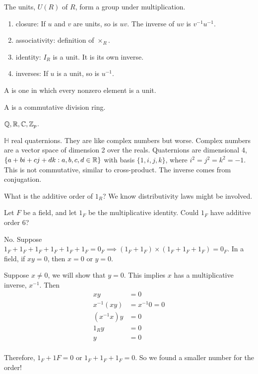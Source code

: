 \documentclass[class=article,crop=false]{standalone}
\begin{document}
\begin{thm}[]
	The units, $ U(R)$ of  $ R$, form a group under multiplication.
\end{thm}
\begin{prf}
\begin{enumerate}[label=(\roman*)]
	\item closure: If $ u$ and  $ v$ are units, so is  $ uv$. The inverse of  $ uv$ is $ v^{-1}u^{-1}$.
	\item associativity: definition of $ \times _R$.
	\item identity: $ I_R$ is a unit. It is its own inverse.
	\item inverses: If  $ u$ is a unit, so is  $ u^{-1}$.
\end{enumerate}
\end{prf}
\begin{defn}
A  is one in which every nonzero element is a unit. 
\end{defn}
\begin{defn}[fields]
	A  is a commutative division ring. 
\end{defn}
\begin{eg}[]
$ \mathbb{Q}, \mathbb{R}, \mathbb{C}, \mathbb{Z}_p$.
\end{eg}
\begin{eg}
	$ \mathbb{H}$ real quaternions. They are like complex numbers but worse. Complex numbers are a vector space of dimension 2 over the reals. Quaternions are dimensional 4, $ \{a+bi+cj+dk: a,b,c,d \in \mathbb{R}\} $ with basis $ \{1,i,j,k\} $, where $ i^2=j^2=k^2=-1$. This is not commutative, similar to cross-product. The inverse comes from conjugation.
\end{eg}

What is the additive order of $ 1_R$? We know distributivity laws might be involved.
 \begin{eg}[]
	 Let $ F$ be a field, and let  $ 1_F$ be the multiplicative identity. Could  $ 1_F$ have additive order 6?

	 No. Suppose  $ 1_F+1_F+1_F+1_F+1_F+1_F = 0_F \implies (1_F + 1_F)\times (1_F+1_F+1_F) = 0_F$. In a field, if $ xy=0$, then  $ x=0$ or  $ y=0$.
	  \begin{prf}
	 Suppose $ x \neq 0$, we will show that  $ y=0$.  This implies $ x$ has a multiplicative inverse,  $ x^{-1}$. Then
	 \begin{align*}
		 xy&=0\\
		 x^{-1}(xy) &= x^{-1} 0 =0\\
		 (x^{-1} x)y &= 0 \\
		 1_R y &= 0 \\
		 y&= 0 \\
	 \end{align*}
	 \end{prf}
	 Therefore, $ 1_F+1F=0$ or  $ 1_F+1_F+1_F=0$. So we found a smaller number for the order! 
\end{eg}
\end{document}
